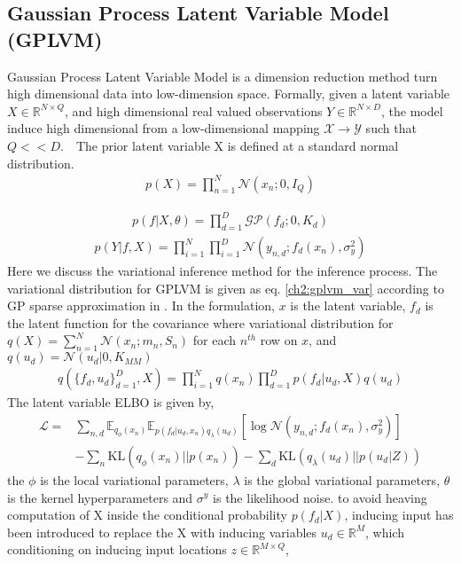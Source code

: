\subsection{Gaussian Process Latent Variable Model (GPLVM)}
Gaussian Process Latent Variable Model \cite{lawrence_gaussian_nodate,titsias_bayesian_nodate} is a dimension reduction method turn high dimensional data into low-dimension space. Formally, given a latent variable $ X\in\mathbb{R}^{N\times Q} $, and high dimensional real valued observations $ Y\in\mathbb{R}^{N\times D} $, the model induce high dimensional from a low-dimensional mapping $ \mathcal{X}\rightarrow\mathcal{Y} $ such that $ Q<<D $.　The prior latent variable X is defined at a standard normal distribution. 
\begin{align*}
p(X)=\prod_{n=1}^{N}\mathcal{N}(x_n;0,I_Q)
\end{align*}

\begin{align*}
p(f|X,\theta)=\prod_{d=1}^{D}\mathcal{GP}(f_d;0,K_d)
\end{align*}
\begin{align*}
p(Y|f,X)=\prod_{i=1}^{N}\prod_{i=1}^{D}\mathcal{N}(y_{n,d};f_d(x_n),\sigma_y^2)
\end{align*}
Here we discuss the variational inference method for the inference process. The variational distribution for GPLVM is given as eq. \ref{ch2:gplvm_var} according to GP sparse approximation in \cite{lawrence_learning_2007}. In the formulation, $ x  $ is the latent variable, $ f_d $ is the latent function for the covariance 
where variational distribution for $ q(X)=\sum_{n=1}^{N}\mathcal{N}(x_n;m_n,S_n) $ for each $ n^{th} $ row on $ x $, and $ q(u_d)=\mathcal{N}(u_d|0,K_{MM}) $
\begin{align}\label{ch2:gplvm_var}
q(\{f_d,u_d\}^{D}_{d=1},X) = \prod_{i=1}^{N}q(x_n)\prod_{d=1}^{D}p(f_d|u_d,X)q(u_d)
\end{align}
The latent variable ELBO is given by,
\begin{align}
\mathcal{L}=&\sum_{n,d}\mathbb{E}_{q_\phi(x_n)}\mathbb{E}_{p(f_d|u_d,x_n)q_{\lambda}(u_d)}\left[\log\mathcal{N}(y_{n,d};f_d(x_n),\sigma_y^2)\right]\\
&-\sum_{n}\text{KL}(q_{\phi}(x_n)||p(x_n))-\sum_{d}\text{KL}(q_\lambda(u_d)||p(u_d|Z))
\end{align}
the $ \phi $ is the local variational parameters, $ \lambda $ is the global variational parameters, $ \theta $ is the kernel hyperparameters and $ \sigma^y $ is the likelihood noise.
to avoid heaving computation of X inside the conditional probability $ p(f_d|X) $, inducing input has been introduced \cite{lawrence_learning_2007} to replace the X with inducing variables $ u_d\in\mathbb{R}^M $, which conditioning on inducing input locations $ z\in\mathbb{R}^{M\times Q} $, 
